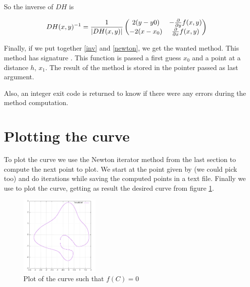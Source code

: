 \documentclass[11pt]{article}
\begin{document}
So the inverse of $DH$ is

\begin{equation}
    \label{inv}
DH(x, y)^{-1} = 
\frac{1}{|DH(x, y)|}
\begin{pmatrix}
    2(y - y0)     & -\df{y}(x, y) \\
    -2(x - x_0)   & \df{x}(x, y)
\end{pmatrix}
\end{equation}

Finally, if we put together \ref{inv} and \ref{newton}, we get the wanted method.
This method has signature .
This function is passed a first guess $x_0$ and a point at a distance $h$, $x_1$.
The result of the method is stored in the pointer passed as last argument.

Also, an integer exit code is returned to know if there were any errors during the method computation.

\section{Plotting the curve}

To plot the curve we use the Newton iterator method from the last section to compute the next point to plot.
We start at the point given by  (we could pick  too) and do  iterations
while saving the computed points in a text file.
Finally we use  to plot the curve, getting as result the desired curve from figure \ref{fig:plot}.

\begin{figure}[H]
    \centering
    \includegraphics[width=0.35\textwidth]{YaremaTaras.png}
    \caption{Plot of the curve such that $f(C) = 0$}
    \label{fig:plot}
\end{figure}



\end{document}
